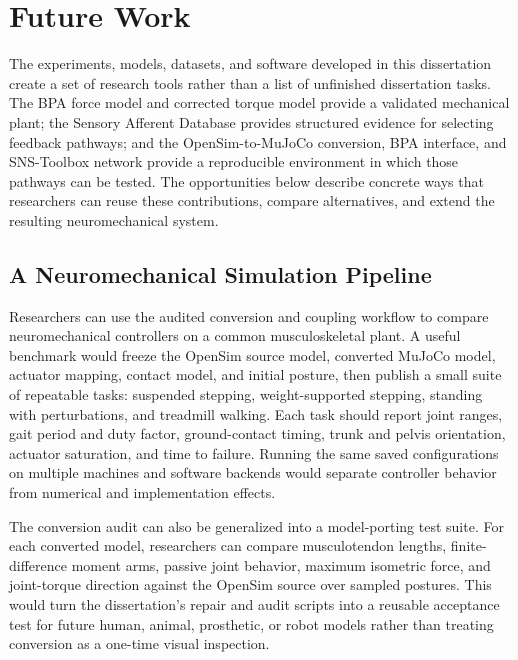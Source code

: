 \chapter{Future Work}\label{ch:futurework}
\graphicspath{{./figs/FutureWork/}{./figs/Aim1/}{./figs/Aim2/}{./figs/Preliminary/}}

\begin{reviewchange}
The experiments, models, datasets, and software developed in this dissertation create a set of research tools rather than a list of unfinished dissertation tasks. The BPA force model and corrected torque model provide a validated mechanical plant; the Sensory Afferent Database provides structured evidence for selecting feedback pathways; and the OpenSim-to-MuJoCo conversion, BPA interface, and SNS-Toolbox network provide a reproducible environment in which those pathways can be tested. The opportunities below describe concrete ways that researchers can reuse these contributions, compare alternatives, and extend the resulting neuromechanical system.
\end{reviewchange}

\section{A Neuromechanical Simulation Pipeline}\label{sec:fw_pipeline}

\begin{reviewchange}
Researchers can use the audited conversion and coupling workflow to compare neuromechanical controllers on a common musculoskeletal plant. A useful benchmark would freeze the OpenSim source model, converted MuJoCo model, actuator mapping, contact model, and initial posture, then publish a small suite of repeatable tasks: suspended stepping, weight-supported stepping, standing with perturbations, and treadmill walking. Each task should report joint ranges, gait period and duty factor, ground-contact timing, trunk and pelvis orientation, actuator saturation, and time to failure. Running the same saved configurations on multiple machines and software backends would separate controller behavior from numerical and implementation effects.

The conversion audit can also be generalized into a model-porting test suite. For each converted model, researchers can compare musculotendon lengths, finite-difference moment arms, passive joint behavior, maximum isometric force, and joint-torque direction against the OpenSim source over sampled postures. This would turn the dissertation's repair and audit scripts into a reusable acceptance test for future human, animal, prosthetic, or robot models rather than treating conversion as a one-time visual inspection.
\end{reviewchange}

